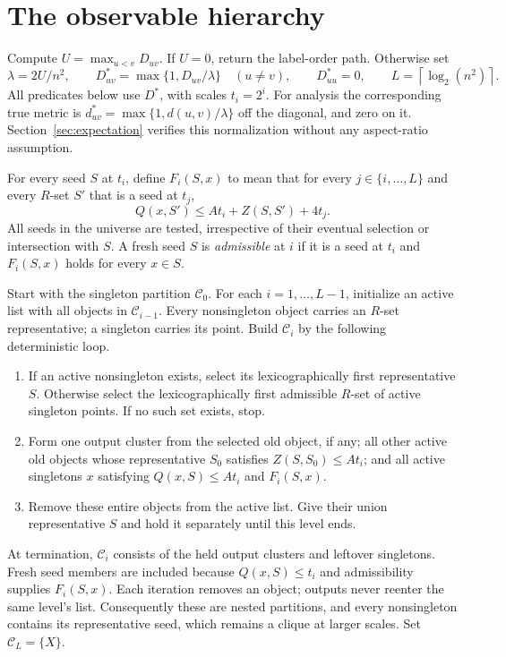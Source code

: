 \documentclass[acmsmall,11pt,nonacm]{acmart}
\theoremstyle{definition}
\newcommand{\calC}{\mathcal C}
\newcommand{\ceil}[1]{\left\lceil #1\right\rceil}
\begin{document}
\section{The observable hierarchy}\label{sec:algorithm}

Compute $U=\max_{u<v}D_{uv}$. If $U=0$, return the label-order path.
Otherwise set
\[
 \lambda=2U/n^2,\qquad D^*_{uv}=\max\{1,D_{uv}/\lambda\}\quad(u\ne v),
 \qquad D^*_{uu}=0,\qquad L=\ceil{\log_2(n^2)}.
\]
All predicates below use $D^*$, with scales $t_i=2^i$. For analysis the
corresponding true metric is $d^*_{uv}=\max\{1,d(u,v)/\lambda\}$ off the
diagonal, and zero on it. Section~\ref{sec:expectation} verifies this
normalization without any aspect-ratio assumption.

For every seed $S$ at $t_i$, define $F_i(S,x)$ to mean that for every
$j\in\{i,\ldots,L\}$ and every $R$-set $S'$ that is a seed at $t_j$,
\begin{equation}\label{eq:future}
 Q(x,S')\leq At_i+Z(S,S')+4t_j.
\end{equation}
All seeds in the universe are tested, irrespective of their eventual selection
or intersection with $S$. A fresh seed $S$ is \emph{admissible} at $i$ if
it is a seed at $t_i$ and $F_i(S,x)$ holds for every $x\in S$.

Start with the singleton partition $\calC_0$. For each $i=1,\ldots,L-1$,
initialize an active list with all objects in $\calC_{i-1}$. Every
nonsingleton object carries an $R$-set representative; a singleton carries
its point. Build $\calC_i$ by the following deterministic loop.
\begin{enumerate}
\item If an active nonsingleton exists, select its lexicographically first
representative $S$. Otherwise select the lexicographically first admissible
$R$-set of active singleton points. If no such set exists, stop.
\item Form one output cluster from the selected old object, if any; all
other active old objects whose representative $S_0$ satisfies
$Z(S,S_0)\leq At_i$; and all active singletons $x$ satisfying
$Q(x,S)\leq At_i$ and $F_i(S,x)$.
\item Remove these entire objects from the active list. Give their union
representative $S$ and hold it separately until this level ends.
\end{enumerate}
At termination, $\calC_i$ consists of the held output clusters and leftover
singletons. Fresh seed members are included because $Q(x,S)\leq t_i$ and
admissibility supplies $F_i(S,x)$. Each iteration removes an object; outputs
never reenter the same level's list. Consequently these are nested partitions,
and every nonsingleton contains its representative seed, which remains a
clique at larger scales. Set $\calC_L=\{X\}$.
\end{document}
